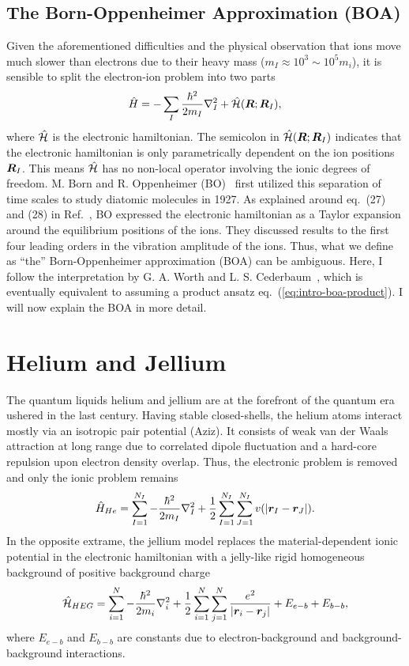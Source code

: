 \subsection{The Born-Oppenheimer Approximation (BOA)}
Given the aforementioned difficulties and the physical observation that ions move much slower than electrons due to their heavy mass ($m_I\approx 10^3\sim 10^5 m_i$), it is sensible to split the electron-ion problem into two parts
\begin{align} \label{eq:intro-ei-to-e-ham}
\hat{H} = -\sum_I \frac{\hbar^2}{2m_I} \nabla^2_I
+ \hat{\mathcal{H}}(\boldsymbol{R};\boldsymbol{R}_I),
\end{align}
where $\hat{\mathcal{H}}$ is the electronic hamiltonian. The semicolon in $\hat{\mathcal{H}}(\boldsymbol{R};\boldsymbol{R}_I)$ indicates that the electronic hamiltonian is only parametrically dependent on the ion positions $\boldsymbol{R}_I$. This means $\hat{\mathcal{H}}$ has no non-local operator involving the ionic degrees of freedom. M. Born and R. Oppenheimer (BO)~\cite{Born1927} first utilized this separation of time scales to study diatomic molecules in 1927. As explained around eq.~(27) and (28) in Ref.~\cite{Born1927}, BO expressed the electronic hamiltonian as a Taylor expansion around the equilibrium positions of the ions. They discussed results to the first four leading orders in the vibration amplitude of the ions. Thus, what we define as ``the'' Born-Oppenheimer approximation (BOA) can be ambiguous. Here, I follow the interpretation by G. A. Worth and L. S. Cederbaum~\cite{Worth2004}, which is eventually equivalent to assuming a product ansatz eq.~(\ref{eq:intro-boa-product}). I will now explain the BOA in more detail.



\section{Helium and Jellium}
The quantum liquids helium and jellium are at the forefront of the quantum era ushered in the last century.
Having stable closed-shells, the helium atoms interact mostly via an isotropic pair potential (Aziz). It consists of weak van der Waals attraction at long range due to correlated dipole fluctuation and a hard-core repulsion upon electron density overlap.
Thus, the electronic problem is removed and only the ionic problem remains
\begin{align}
\hat{H}_{He} = \sum\limits_{I=1}^{N_I} -\dfrac{\hbar^2}{2m_I}\nabla_I^2
+\frac{1}{2}\sum\limits_{I=1}^{N_I}\sum\limits_{J=1}^{N_I} v(\vert\boldsymbol{r}_I-\boldsymbol{r}_J\vert).
\end{align}
In the opposite extrame, the jellium model replaces the material-dependent ionic potential in the electronic hamiltonian with a jelly-like rigid homogeneous background of positive background charge
\begin{align} \label{eq:intro-jellium}
\hat{\mathcal{H}}_{HEG} = \sum\limits_{i=1}^N -\dfrac{\hbar^2}{2m_i}\nabla_i^2 + \frac{1}{2}\sum\limits_{i=1}^N\sum\limits_{j=1}^N
\dfrac{e^2}{\vert \boldsymbol{r}_i-\boldsymbol{r}_j \vert}
+E_{e-b}+E_{b-b},
\end{align}
where $E_{e-b}$ and $E_{b-b}$ are constants due to electron-background and background-background interactions.


